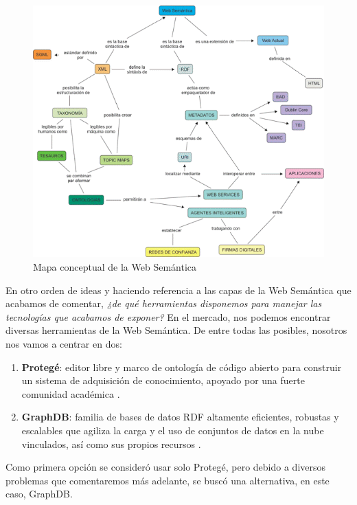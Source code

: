 \begin{figure}[H]
	\centering
	\includegraphics[width=1\linewidth]{imagenes/capitulo3/mapawebsemantica-3}
	\caption{Mapa conceptual de la Web Semántica \cite{imagen-final-esquema-ws}}
	\label{fig:mapawebsemantica-3}
\end{figure}

En otro orden de ideas y haciendo referencia a las capas de la Web Semántica que acabamos de comentar, \textit{¿de qué herramientas disponemos para manejar las tecnologías que acabamos de exponer?} En el mercado, nos podemos encontrar diversas herramientas de la Web Semántica. De entre todas las posibles, nosotros nos vamos a centrar en dos: 

\begin{enumerate}
	\item \textbf{Protegé}: editor libre y marco de ontología de código abierto para construir un sistema de adquisición de conocimiento, apoyado por una fuerte comunidad académica \cite{protege}. 
	
	\item \textbf{GraphDB}: familia de bases de datos RDF altamente eficientes, robustas y escalables que agiliza la carga y el uso de conjuntos de datos en la nube vinculados, así como sus propios recursos \cite{graphdb}.
\end{enumerate}

 Como primera opción se consideró usar solo Protegé, pero debido a diversos problemas que comentaremos más adelante, se buscó una alternativa, en este caso, GraphDB.  







